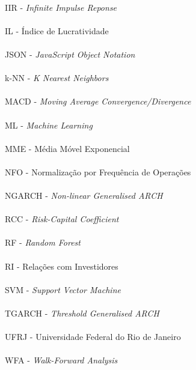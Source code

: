 \paragraph{}IIR - \textit{Infinite Impulse Reponse}
\paragraph{}IL - Índice de Lucratividade
\paragraph{}JSON - \textit{JavaScript Object Notation}
\paragraph{}k-NN - \textit{K Nearest Neighbors}
\paragraph{}MACD - \textit{Moving Average Convergence/Divergence}
\paragraph{}ML - \textit{Machine Learning}
\paragraph{}MME - Média Móvel Exponencial
\paragraph{}NFO - Normalização por Frequência de Operações
\paragraph{}NGARCH - \textit{Non-linear Generalised ARCH}
\paragraph{}RCC - \textit{Risk-Capital Coefficient}
\paragraph{}RF - \textit{Random Forest}
\paragraph{}RI - Relações com Investidores
\paragraph{}SVM - \textit{Support Vector Machine}
\paragraph{}TGARCH - \textit{Threshold Generalised ARCH}
\paragraph{}UFRJ - Universidade Federal do Rio de Janeiro
\paragraph{}WFA - \textit{Walk-Forward Analysis}

\pagebreak